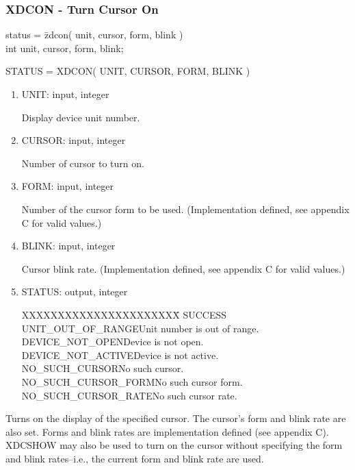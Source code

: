 \subsubsection{XDCON - Turn Cursor On}
\begin{tabbing}
status = \=zdcon( unit, cursor, form, blink )\\
\>int  unit, cursor, form, blink;\\
\end{tabbing}
STATUS = XDCON( UNIT, CURSOR, FORM, BLINK )
\begin{enumerate}
\item UNIT:  input, integer

Display device unit number.
\item CURSOR:  input, integer

Number of cursor to turn on.
\item FORM:  input, integer

Number of the cursor form to be used.  (Implementation defined, see
appendix C for valid values.)
\item BLINK:  input, integer

Cursor blink rate.  (Implementation defined, see appendix C for valid
values.)
\item STATUS:  output, integer
\begin{tabbing}
XXXXXXXXXXXXXXXXXXXXXX\=\kill
SUCCESS\\
UNIT\_OUT\_OF\_RANGE\>Unit number is out of range.\\
DEVICE\_NOT\_OPEN\>Device is not open.\\
DEVICE\_NOT\_ACTIVE\>Device is not active.\\
NO\_SUCH\_CURSOR\>No such cursor.\\
NO\_SUCH\_CURSOR\_FORM\>No such cursor form.\\
NO\_SUCH\_CURSOR\_RATE\>No such cursor rate.\\
\end{tabbing}
\end{enumerate}
Turns on the display of the specified cursor.  The cursor's form and
blink rate are also set.  Forms and blink rates are implementation
defined (see appendix C).  XDCSHOW may also be used to turn on the
cursor without specifying the form and blink rates--i.e., the current
form and blink rate are used.
\newpage
